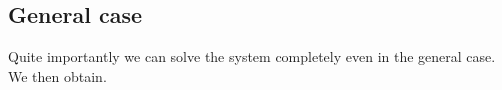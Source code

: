 \subsection{General case}

Quite importantly we can solve the system completely even in the general case. We then obtain.